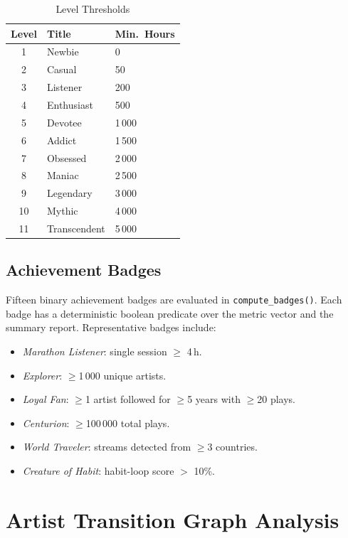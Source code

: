 \documentclass[conference]{IEEEtran}
\begin{document}
\begin{table}[ht]
\caption{Level Thresholds}
\label{tab:levels}
\centering
\begin{tabular}{cll}
\toprule
\textbf{Level} & \textbf{Title} & \textbf{Min.\ Hours} \\
\midrule
1  & Newbie       & 0 \\
2  & Casual       & 50 \\
3  & Listener     & 200 \\
4  & Enthusiast   & 500 \\
5  & Devotee      & 1\,000 \\
6  & Addict       & 1\,500 \\
7  & Obsessed     & 2\,000 \\
8  & Maniac       & 2\,500 \\
9  & Legendary    & 3\,000 \\
10 & Mythic       & 4\,000 \\
11 & Transcendent & 5\,000 \\
\bottomrule
\end{tabular}
\end{table}

\subsection{Achievement Badges}

Fifteen binary achievement badges are evaluated in \texttt{compute\_badges()}.
Each badge has a deterministic boolean predicate over the metric vector and
the summary report. Representative badges include:
\begin{itemize}
  \item \textit{Marathon Listener}: single session $\geq$ 4\,h.
  \item \textit{Explorer}: $\geq$1\,000 unique artists.
  \item \textit{Loyal Fan}: $\geq$1 artist followed for $\geq$5 years with
        $\geq$20 plays.
  \item \textit{Centurion}: $\geq$100\,000 total plays.
  \item \textit{World Traveler}: streams detected from $\geq$3 countries.
  \item \textit{Creature of Habit}: habit-loop score $>$ 10\%.
\end{itemize}

\section{Artist Transition Graph Analysis}
\end{document}
